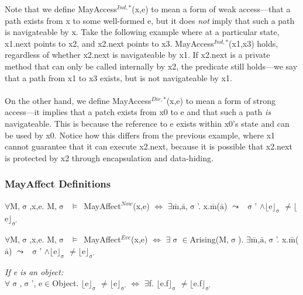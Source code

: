 \documentclass[a4paper,11pt, twoside,twocolumn]{article}
\newenvironment{logic}[1][null]
{\begin{flushleft} \small \label{#1}}
{\end{flushleft}}
\newcommand{\loin}{$\in$}
\newcommand{\loforall}{$\forall$}
\newcommand{\loexists}{$\exists$}
\newcommand{\loand}{$\land$}
\newcommand{\loneq} {$\neq$}
\newcommand{\losigma}{$\upsigma$}
\newcommand{\loturns} {$\vDash$}
\newcommand{\loiff} {$\iff$}
\newcommand{\loleadsto} {$\leadsto$}
\newcommand{\loexec}[2] {$\lfloor$#1$\rfloor _{\text{#2}}$}
\newcommand{\loconj}[1] {$\bar{\text{#1}}$}
\newcommand{\ablock} {\null\qquad}
\begin{document}
Note that we define MayAccess$^{Ind,*}$(x,e) to mean a form of weak access---that a path exists from x to some well-formed e, but it does \textit{not} imply that such a path is navigateable by x. Take the following example where at a particular state, x1.next points to x2, and x2.next points to x3. MayAccess$^{Ind,*}$(x1,x3) holds, regardless of whether x2.next is navigateable by x1. If x2.next is a private method that can only be called internally by x2, the predicate still holds---we say that a path from x1 to x3 exists, but is not navigateable by x1.\\ \\
On the other hand, we define MayAccess$^{Dir,*}$(x,e) to mean a form of strong access---it implies that a patch exists from x0 to e and that such a path \textit{is} navigateable. This is because the reference to e exists within x0's state and can be used by x0. Notice how this differs from the previous example, where x1 cannot guarantee that it can execute x2.next, because it is possible that x2.next is protected by x2 through encapsulation and data-hiding. 

\subsubsection{MayAffect Definitions}
\begin{logic}[MayAffectNow]
\loforall M,\losigma,x,e. M,\losigma\ \loturns\ MayAffect$^{Now}$(x,e) \loiff \linebreak
\ablock \loexists \loconj{m},\loconj{a},\losigma'. x.\loconj{m}(\loconj{a}) \loleadsto\ \losigma' \loand \loexec{e}{\losigma} \loneq \loexec{e}{\losigma'}
\end{logic}
\begin{logic}[MayAffectEve]
\loforall M,\losigma,x,e. M,\losigma\ \loturns\ MayAffect$^{Eve}$(x,e) \loiff \linebreak
\ablock \loexists \losigma \loin Arising(M,\losigma).\linebreak
\ablock \loexists \loconj{m},\loconj{a},\losigma'. x.\loconj{m}(\loconj{a}) \loleadsto\ \losigma' \loand \loexec{e}{\losigma} \loneq \loexec{e}{\losigma'}
\end{logic}
\begin{logic}[AffectObject]
\textit{If e is an object:} \\
\loforall\losigma,\losigma', e\loin Object. \loexec{e}{\losigma} \loneq \loexec{e}{\losigma'} \loiff \linebreak
\ablock \loexists f. \loexec{e.f}{\losigma} \loneq \loexec{e.f}{\losigma'}
\end{logic}
\end{document}

